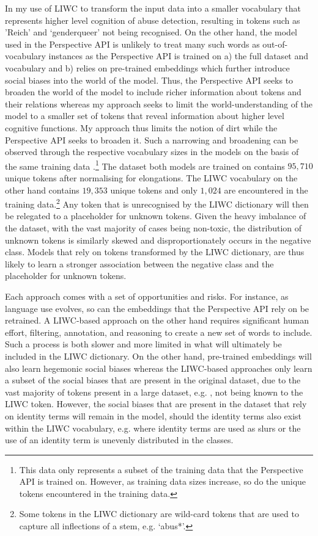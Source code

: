 In my use of LIWC to transform the input data into a smaller vocabulary that represents higher level cognition of abuse detection, resulting in tokens such as 'Reich' and `genderqueer' not being recognised. On the other hand, the model used in the Perspective API is unlikely to treat many such words as out-of-vocabulary instances as the Perspective API is trained on a) the full dataset and vocabulary and b) relies on pre-trained embeddings which further introduce social biases into the world of the model. Thus, the Perspective API seeks to broaden the world of the model to include richer information about tokens and their relations whereas my approach seeks to limit the world-understanding of the model to a smaller set of tokens that reveal information about higher level cognitive functions. My approach thus limits the notion of dirt while the Perspective API seeks to broaden it. Such a narrowing and broadening can be observed through the respective vocabulary sizes in the models on the basis of the same training data \citep{Wulczyn:2017}.\footnote{This data only represents a subset of the training data that the Perspective API is trained on. However, as training data sizes increase, so do the unique tokens encountered in the training data.} The dataset both models are trained on contains $95,710$ unique tokens after normalising for elongations. The LIWC vocabulary on the other hand contains $19,353$ unique tokens and only $1,024$ are encountered in the training data.\footnote{Some tokens in the LIWC dictionary are wild-card tokens that are used to capture all inflections of a stem, e.g. `abus*'.} Any token that is unrecognised by the LIWC dictionary will then be relegated to a placeholder for unknown tokens.
Given the heavy imbalance of the dataset, with the vast majority of cases being non-toxic, the distribution of unknown tokens is similarly skewed and disproportionately occurs in the negative class. Models that rely on tokens transformed by the LIWC dictionary, are thus likely to learn a stronger association between the negative class and the placeholder for unknown tokens.

Each approach comes with a set of opportunities and risks. For instance, as language use evolves, so can the embeddings that the Perspective API rely on be retrained. A LIWC-based approach on the other hand requires significant human effort, filtering, annotation, and reasoning to create a new set of words to include. Such a process is both slower and more limited in what will ultimately be included in the LIWC dictionary. On the other hand, pre-trained embeddings will also learn hegemonic social biases \citep{Bender:2021} whereas the LIWC-based approaches only learn a subset of the social biases that are present in the original dataset, due to the vast majority of tokens present in a large dataset, e.g. \citep{Wulczyn:2017}, not being known to the LIWC token. However, the social biases that are present in the dataset that rely on identity terms will remain in the model, should the identity terms also exist within the LIWC vocabulary, e.g. where identity terms are used as slurs or the use of an identity term is unevenly distributed in the classes.

